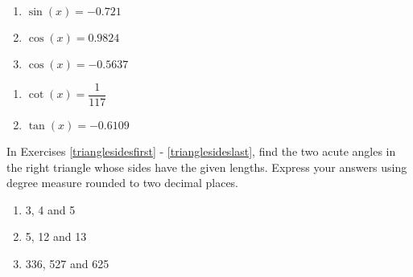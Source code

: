 \begin{multicols}{3}

\begin{enumerate}

\setcounter{enumi}{\value{HW}}

\item $\sin(x) = -0.721$
\item $\cos(x) = 0.9824$
\item $\cos(x) = -0.5637$

\setcounter{HW}{\value{enumi}}

\end{enumerate}

\end{multicols}

\begin{multicols}{3}

\begin{enumerate}

\setcounter{enumi}{\value{HW}}

\item $\cot(x) = \dfrac{1}{117}$
\item $\tan(x) = -0.6109$  \label{equarctriglast}

\setcounter{HW}{\value{enumi}}

\end{enumerate}

\end{multicols}

In Exercises \ref{trianglesidesfirst} - \ref{trianglesideslast}, find the two acute angles in the right triangle whose sides have the given lengths.  Express your answers using degree measure rounded to two decimal places.

\begin{multicols}{3}

\begin{enumerate}

\setcounter{enumi}{\value{HW}}

\item 3, 4 and 5 \label{trianglesidesfirst}

\item 5, 12 and 13

\item 336, 527 and 625 \label{trianglesideslast}

\setcounter{HW}{\value{enumi}}

\end{enumerate}

\end{multicols}

